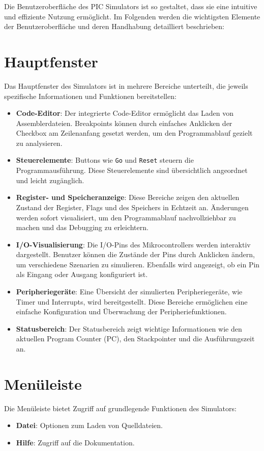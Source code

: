 Die Benutzeroberfläche des PIC Simulators ist so gestaltet, dass sie eine intuitive und effiziente Nutzung ermöglicht. Im Folgenden werden die wichtigsten Elemente der Benutzeroberfläche und deren Handhabung detailliert beschrieben:

\section{Hauptfenster}
Das Hauptfenster des Simulators ist in mehrere Bereiche unterteilt, die jeweils spezifische Informationen und Funktionen bereitstellen:
\begin{itemize}
    \item \textbf{Code-Editor}: Der integrierte Code-Editor ermöglicht das Laden von Assemblerdateien. Breakpoints können durch einfaches Anklicken der Checkbox am Zeilenanfang gesetzt werden, um den Programmablauf gezielt zu analysieren.
    \item \textbf{Steuerelemente}: Buttons wie \texttt{Go} und \texttt{Reset} steuern die Programmausführung. Diese Steuerelemente sind übersichtlich angeordnet und leicht zugänglich.
    \item \textbf{Register- und Speicheranzeige}: Diese Bereiche zeigen den aktuellen Zustand der Register, Flags und des Speichers in Echtzeit an. Änderungen werden sofort visualisiert, um den Programmablauf nachvollziehbar zu machen und das Debugging zu erleichtern.
    \item \textbf{I/O-Visualisierung}: Die I/O-Pins des Mikrocontrollers werden interaktiv dargestellt. Benutzer können die Zustände der Pins durch Anklicken ändern, um verschiedene Szenarien zu simulieren. Ebenfalls wird angezeigt, ob ein Pin als Eingang oder Ausgang konfiguriert ist.
    \item \textbf{Peripheriegeräte}: Eine Übersicht der simulierten Peripheriegeräte, wie Timer und Interrupts, wird bereitgestellt. Diese Bereiche ermöglichen eine einfache Konfiguration und Überwachung der Peripheriefunktionen.
    \item \textbf{Statusbereich}: Der Statusbereich zeigt wichtige Informationen wie den aktuellen Program Counter (PC), den Stackpointer und die Ausführungszeit an.
\end{itemize}

\section{Menüleiste}
Die Menüleiste bietet Zugriff auf grundlegende Funktionen des Simulators:
\begin{itemize}
    \item \textbf{Datei}: Optionen zum Laden von Quelldateien.
    \item \textbf{Hilfe}: Zugriff auf die Dokumentation.
\end{itemize}

